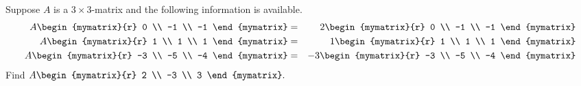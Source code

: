 \begin{enumialphparenastyle}
\begin{ex} Suppose $A$ is a $3\times 3$-matrix and the following information is
available.
\begin{eqnarray*}
A\begin{mymatrix}{r}
0 \\
-1 \\
-1
\end{mymatrix} &=&2\begin{mymatrix}{r}
0 \\
-1 \\
-1
\end{mymatrix} \\
A\begin{mymatrix}{r}
1 \\
1 \\
1
\end{mymatrix} &=& 1\begin{mymatrix}{r}
1 \\
1 \\
1
\end{mymatrix} \\
A\begin{mymatrix}{r}
-3 \\
-5 \\
-4
\end{mymatrix} &=&-3\begin{mymatrix}{r}
-3 \\
-5 \\
-4
\end{mymatrix}
\end{eqnarray*}
Find $A\begin{mymatrix}{r}
2 \\
-3 \\
3
\end{mymatrix}. $ \vspace{1mm}
\end{ex}

\end{enumialphparenastyle}
